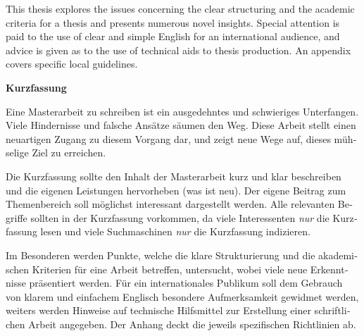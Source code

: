 This thesis explores the issues concerning the clear structuring and
the academic criteria for a thesis and presents numerous novel
insights. Special attention is paid to the use of clear and simple
English for an international audience, and advice is given as to the
use of technical aids to thesis production. An appendix covers
specific local guidelines.








\cleardoublepage

\vspace*{2cm}


\begin{otherlanguage}{austrian}

\begin{center}
{\Large\sffamily\bfseries Kurzfassung}
\end{center}


Eine Masterarbeit zu schreiben ist ein ausgedehntes und schwieriges
Unterfangen. Viele Hindernisse und falsche Ansätze säumen den
Weg. Diese Arbeit stellt einen neuartigen Zugang zu diesem Vorgang
dar, und zeigt neue Wege auf, dieses mühselige Ziel zu erreichen.

Die Kurzfassung sollte den Inhalt der Masterarbeit kurz und klar
beschreiben und die eigenen Leistungen hervorheben (was ist neu). Der
eigene Beitrag zum Themenbereich soll möglichst interessant
dargestellt werden. Alle relevanten Begriffe sollten in der
Kurzfassung vorkommen, da viele Interessenten \emph{nur} die
Kurzfassung lesen und viele Suchmaschinen \emph{nur} die Kurzfassung
indizieren.

Im Besonderen werden Punkte, welche die klare Strukturierung und die
akademischen Kriterien für eine Arbeit betreffen, untersucht, wobei
viele neue Erkenntnisse präsentiert werden. Für ein internationales
Publikum soll dem Gebrauch von klarem und einfachem Englisch besondere
Aufmerksamkeit gewidmet werden, weiters werden Hinweise auf technische
Hilfsmittel zur Erstellung einer schriftlichen Arbeit angegeben. Der
Anhang deckt die jeweils spezifischen Richtlinien ab.

\end{otherlanguage}



